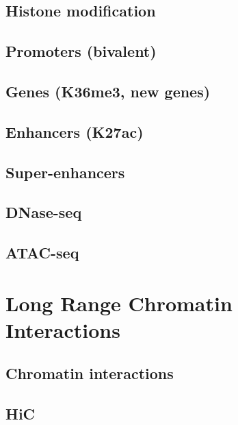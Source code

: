\documentclass[
]{book}
\begin{document}
\hypertarget{histone-modification}{%
\section{Histone modification}\label{histone-modification}}

\hypertarget{promoters-bivalent}{%
\section{Promoters (bivalent)}\label{promoters-bivalent}}

\hypertarget{genes-k36me3-new-genes}{%
\section{Genes (K36me3, new genes)}\label{genes-k36me3-new-genes}}

\hypertarget{enhancers-k27ac}{%
\section{Enhancers (K27ac)}\label{enhancers-k27ac}}

\hypertarget{super-enhancers}{%
\section{Super-enhancers}\label{super-enhancers}}

\hypertarget{dnase-seq}{%
\section{DNase-seq}\label{dnase-seq}}

\hypertarget{atac-seq}{%
\section{ATAC-seq}\label{atac-seq}}

\hypertarget{lrci}{%
\chapter{Long Range Chromatin Interactions}\label{lrci}}

\hypertarget{chromatin-interactions}{%
\section{Chromatin interactions}\label{chromatin-interactions}}

\hypertarget{hic}{%
\section{HiC}\label{hic}}
\end{document}
